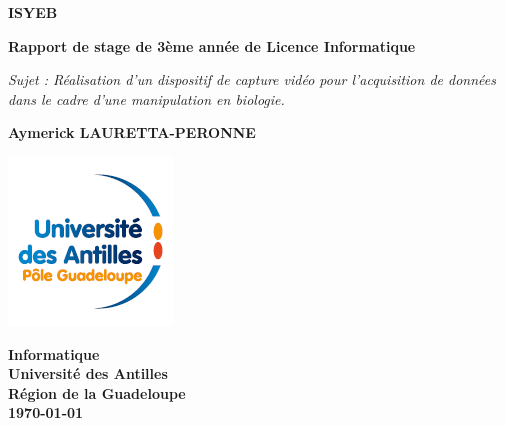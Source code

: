 \documentclass[a4paper, 11pt]{report}
\begin{document}
\begin{titlepage}
    \begin{center}
        \vspace*{1cm}

        \textbf{\Huge{ISYEB}}

        \vspace{0.5cm}

        \textbf{Rapport de stage de 3ème année de Licence Informatique} 

        \vspace{0.5cm}

        \small{\textit{Sujet : Réalisation d'un dispositif de capture vidéo pour l’acquisition de données dans le cadre d’une manipulation en biologie.}}

        \vspace{1.5cm}

        \textbf{Aymerick LAURETTA-PERONNE} \\

        \vfill


        \vspace{0.8cm}

        \includegraphics[]{logo.png}
        
        \textbf{Informatique} \\
        \textbf{Université des Antilles} \\
        \textbf{Région de la Guadeloupe} \\
        \vspace{0.5cm}
        \textbf{\today {}}
         
    \end{center}
\end{titlepage}

\dominitoc
\tableofcontents
\end{document}
